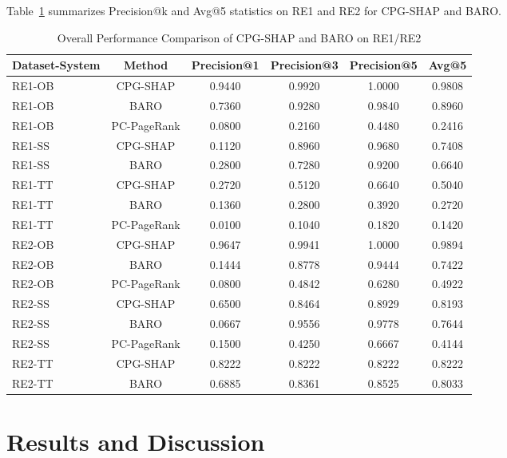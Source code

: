 \documentclass[conference]{IEEEtran}
\begin{document}
Table~\ref{tab:overall_results} summarizes Precision@k and Avg@5 statistics on RE1 and RE2 for CPG-SHAP and BARO.

\begin{table}[t]
    \centering
    \caption{Overall Performance Comparison of CPG-SHAP and BARO on RE1/RE2}
    \label{tab:overall_results}
    \small
    \begin{tabular}{lccccc}
        \toprule
        Dataset-System & Method & Precision@1 & Precision@3 & Precision@5 & Avg@5 \\
        \midrule
        RE1-OB & CPG-SHAP & 0.9440 & 0.9920 & 1.0000 & 0.9808 \\
        RE1-OB & BARO & 0.7360 & 0.9280 & 0.9840 & 0.8960 \\
        RE1-OB & PC-PageRank & 0.0800 & 0.2160 & 0.4480 & 0.2416 \\
        \midrule
        RE1-SS & CPG-SHAP & 0.1120 & 0.8960 & 0.9680 & 0.7408 \\
        RE1-SS & BARO & 0.2800 & 0.7280 & 0.9200 & 0.6640 \\
        \midrule
        RE1-TT & CPG-SHAP & 0.2720 & 0.5120 & 0.6640 & 0.5040 \\
        RE1-TT & BARO & 0.1360 & 0.2800 & 0.3920 & 0.2720 \\
        RE1-TT & PC-PageRank & 0.0100 & 0.1040 & 0.1820 & 0.1420 \\
        \midrule
        RE2-OB & CPG-SHAP & 0.9647 & 0.9941 & 1.0000 & 0.9894 \\
        RE2-OB & BARO & 0.1444 & 0.8778 & 0.9444 & 0.7422 \\
        RE2-OB & PC-PageRank & 0.0800 & 0.4842 & 0.6280 & 0.4922 \\
        \midrule
        RE2-SS & CPG-SHAP & 0.6500 & 0.8464 & 0.8929 & 0.8193 \\
        RE2-SS & BARO & 0.0667 & 0.9556 & 0.9778 & 0.7644 \\
        RE2-SS & PC-PageRank & 0.1500 & 0.4250 & 0.6667 & 0.4144 \\
        \midrule
        RE2-TT & CPG-SHAP & 0.8222 & 0.8222 & 0.8222 & 0.8222 \\
        RE2-TT & BARO & 0.6885 & 0.8361 & 0.8525 & 0.8033 \\
        \bottomrule
    \end{tabular}
\end{table}

\section{Results and Discussion}
\end{document}
